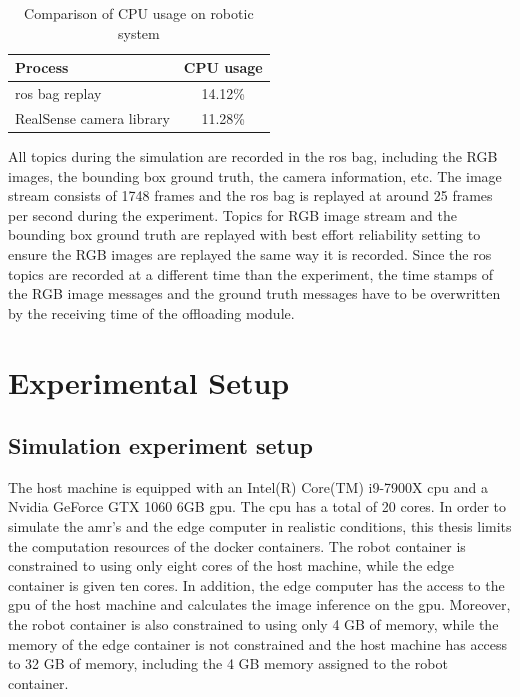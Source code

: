 \begin{table}[htp]
    \centering
    \begin{tabular}{lc}
    \toprule
    Process&                    CPU usage\\
    \midrule
    \gls{ros} bag replay&       14.12\%\\
    RealSense camera library&   11.28\%\\
    \bottomrule
    \end{tabular}
    \caption{Comparison of CPU usage on robotic system}
    \label{tab:ros_bag_comparison}
\end{table}

All topics during the simulation are recorded in the \gls{ros} bag, including the RGB images, the bounding box ground truth, the camera information, etc. The image stream consists of 1748 frames and the \gls{ros} bag is replayed at around 25 frames per second during the experiment. Topics for RGB image stream and the bounding box ground truth are replayed with best effort reliability setting to ensure the RGB images are replayed the same way it is recorded. Since the \gls{ros} topics are recorded at a different time than the experiment, the time stamps of the RGB image messages and the ground truth messages have to be overwritten by the receiving time of the offloading module.

\section{Experimental Setup}\label{sec:experiment:experiment_setup}

\subsection{Simulation experiment setup}

The host machine is equipped with an Intel(R) Core(TM) i9-7900X \gls{cpu} and a Nvidia GeForce GTX 1060 6GB \gls{gpu}. The \gls{cpu} has a total of 20 cores. In order to simulate the \gls{amr}'s and the edge computer in realistic conditions, this thesis limits the computation resources of the \gls{docker} containers. The robot container is constrained to using only eight cores of the host machine, while the edge container is given ten cores. In addition, the edge computer has the access to the \gls{gpu} of the host machine and calculates the image inference on the \gls{gpu}. Moreover, the robot container is also constrained to using only 4 GB of memory, while the memory of the edge container is not constrained and the host machine has access to 32 GB of memory, including the 4 GB memory assigned to the robot container.

